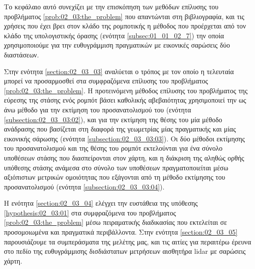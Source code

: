 Το κεφάλαιο αυτό συνεχίζει με την επισκόπηση των μεθόδων επίλυσης του
προβλήματος \ref{prob:02_03:the_problem} που απαντώνται στη βιβλιογραφία, και
τις χρήσεις που έχει βρει στον κλάδο της ρομποτικής η μέθοδος που προέρχεται
από τον κλάδο της υπολογιστικής όρασης (ενότητα \ref{subsec:01_01_02_7}) την
οποία χρησιμοποιούμε για την ευθυγράμμιση πραγματικών με εικονικές σαρώσεις δύο
διαστάσεων.

Στην ενότητα \ref{section:02_03_03} αναλύεται ο τρόπος με τον οποίο η τελευταία
μπορεί να προσαρμοσθεί στα συμφραζόμενα επίλυσης του προβλήματος
\ref{prob:02_03:the_problem}. Η προτεινόμενη μέθοδος επίλυσης του προβλήματος
της εύρεσης της στάσης ενός ρομπότ βάσει καθολικής αβεβαιότητας χρησιμοποιεί
την ως άνω μέθοδο για την εκτίμηση του προσανατολισμού του (ενότητα
\ref{subsection:02_03_03:02}), και για την εκτίμηση της θέσης του μία μέθοδο
ανάδρασης που βασίζεται στη διαφορά της γεωμετρίας μίας πραγματικής και μίας
εικονικής σάρωσης (ενότητα \ref{subsection:02_03_03:03}). Οι δύο μέθοδοι
εκτίμησης του προσανατολισμού και της θέσης του ρομπότ εκτελούνται για ένα
σύνολο υποθέσεων στάσης που διασπείρονται στον χάρτη, και η διάκριση της αληθώς
ορθής υπόθεσης στάσης ανάμεσα στο σύνολο των υποθέσεων πραγματοποιείται μέσω
αξιόπιστων μετρικών ομοιότητας που εξάγονται από τη μέθοδο εκτίμησης του
προσανατολισμού (ενότητα \ref{subsection:02_03_03:04}).

Η ενότητα \ref{section:02_03_04} ελέγχει την ευστάθεια της υπόθεσης
\ref{hypothesis:02_03:01} στα συμφραζόμενα του προβλήματος
\ref{prob:02_03:the_problem} μέσω πειραματικής διαδικασίας που εκτελείται σε
προσομοιωμένα και πραγματικά περιβάλλοντα. Στην ενότητα \ref{section:02_03_05}
παρουσιάζουμε τα συμπεράσματα της μελέτης μας, και τις αιτίες για περαιτέρω
έρευνα στο πεδίο της ευθυγράμμισης δισδιάστατων μετρήσεων αισθητήρα lidar με
σαρώσεις χάρτη.
